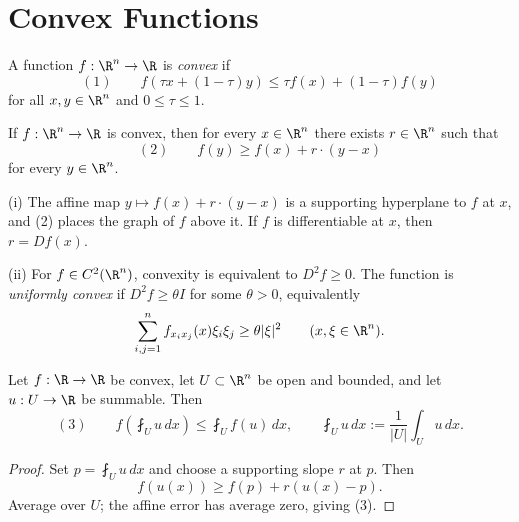 
\section{Convex Functions}
\label{sec:convex-functions}

\begin{definition}
\label{def:convex-function-rn}
A function $f:\R^n\to\R$ is \textit{convex} if
\[
(1)\qquad
f(\tau x+(1-\tau)y)
\leq \tau f(x)+(1-\tau)f(y)
\]
for all $x,y\in\R^n$ and $0\leq\tau\leq1$.
\end{definition}

\begin{theorem}
\label{thm:supporting-hyperplanes}
If $f:\R^n\to\R$ is convex, then for every $x\in\R^n$ there exists $r\in\R^n$ such that
\[
(2)\qquad f(y)\geq f(x)+r\cdot(y-x)
\]
for every $y\in\R^n$.
\end{theorem}

\begin{remark}
\label{rem:supporting-hyperplane-remarks}
(i) The affine map $y\mapsto f(x)+r\cdot(y-x)$ is a supporting hyperplane to $f$ at $x$, and (2) places the graph of $f$ above it. If $f$ is differentiable at $x$, then $r=Df(x)$.

(ii) For $f\in C^2(\R^n)$, convexity is equivalent to $D^2f\geq0$. The function is \textit{uniformly convex} if $D^2f\geq\theta I$ for some $\theta>0$, equivalently
\[
\sum_{i,j=1}^n f_{x_ix_j}(x)\xi_i\xi_j
\geq\theta|\xi|^2
\qquad(x,\xi\in\R^n).
\]
\end{remark}

\begin{theorem}
\label{thm:jensens-inequality}
Let $f:\R\to\R$ be convex, let $U\subset\R^n$ be open and bounded, and let $u:U\to\R$ be summable. Then
\[
(3)\qquad
f\left(\fint_Uu\,dx\right)
\leq\fint_Uf(u)\,dx,
\qquad
\fint_Uu\,dx:=\frac1{|U|}\int_Uu\,dx.
\]
\end{theorem}
\begin{proof}
\sketch Set $p=\fint_Uu\,dx$ and choose a supporting slope $r$ at $p$. Then
\[
f(u(x))\geq f(p)+r(u(x)-p).
\]
Average over $U$; the affine error has average zero, giving (3).
\end{proof}

